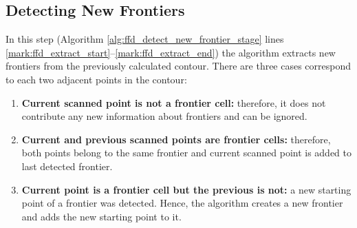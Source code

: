 



	\subsection{Detecting New Frontiers} \label{section:detecting_new_frontiers}
	In this step (Algorithm \ref{alg:ffd_detect_new_frontier_stage} lines
	\ref{mark:ffd_extract_start}--\ref{mark:ffd_extract_end}) the algorithm extracts new frontiers from the previously calculated contour. There are three cases correspond to each two adjacent points in the
	contour: 
	\begin{enumerate}
	\item \textbf{Current scanned point is not a frontier cell:} therefore,
	it does not contribute any new information about frontiers and can be ignored.
	
	\item \textbf{Current and previous scanned points are frontier cells:}
	therefore, both points belong to the same frontier and current scanned point is
	added to last detected frontier.
	
	\item \textbf{Current point is a frontier cell but the previous is
	not:} a new starting point of a frontier was detected. Hence, the algorithm creates a
	new frontier and adds the new starting point to it.
	\end{enumerate}


	 
